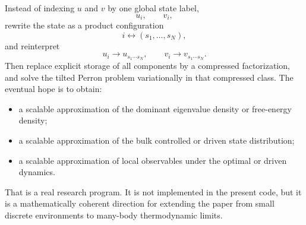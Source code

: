 \documentclass[11pt]{article}
\begin{document}
Instead of indexing \(u\) and \(v\) by one global state label,
\begin{equation}
    u_i,\qquad v_i,
\end{equation}
rewrite the state as a product configuration
\begin{equation}
    i \leftrightarrow (s_1,\dots,s_N),
\end{equation}
and reinterpret
\begin{equation}
    u_i \to u_{s_1\cdots s_N},
    \qquad
    v_i \to v_{s_1\cdots s_N}.
\end{equation}
Then replace explicit storage of all components by a compressed factorization, and solve the
tilted Perron problem variationally in that compressed class. The eventual hope is to obtain:
\begin{itemize}
    \item a scalable approximation of the dominant eigenvalue density or free-energy density;
    \item a scalable approximation of the bulk controlled or driven state distribution;
    \item a scalable approximation of local observables under the optimal or driven dynamics.
\end{itemize}

That is a real research program. It is not implemented in the present code, but it is a
mathematically coherent direction for extending the paper from small discrete environments to
many-body thermodynamic limits.
\end{document}
